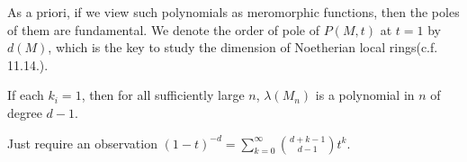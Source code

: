 \documentclass[../main.tex]{subfiles}
\begin{document}
As a priori, if we view such polynomials as meromorphic functions, then the poles of them are fundamental.
We denote the order of pole of \( P(M, t) \) at \( t = 1 \) by \( d(M) \), which is the key to study the dimension of Noetherian local rings(c.f. \cite{Atiyah1969-ud} 11.14.).

\begin{corollary}
  If each \( k_i = 1 \), then for all sufficiently large \( n \), \( \lambda(M_n) \) is a polynomial in \( n \) of degree \( d - 1 \).
\end{corollary}
\begin{sketchproof}
  Just require an observation \( (1 - t)^{-d} = \sum_{k = 0}^{\infty} \binom{d + k - 1}{d - 1}t^k \).
\end{sketchproof}
\end{document}
